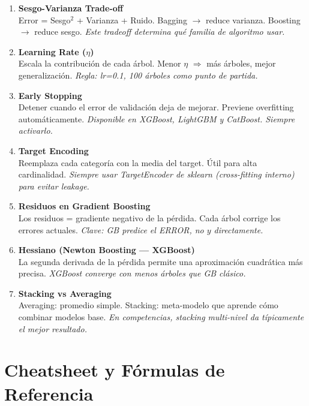 \documentclass[11pt, a4paper]{book}
\begin{document}
\begin{enumerate}[leftmargin=*, label=\textbf{\arabic*.}]
\item \textbf{Sesgo-Varianza Trade-off}\\
  Error = Sesgo$^2$ + Varianza + Ruido. Bagging $\to$ reduce varianza. Boosting $\to$ reduce sesgo.
  \textit{Este tradeoff determina qué familia de algoritmo usar.}

\item \textbf{Learning Rate ($\eta$)}\\
  Escala la contribución de cada árbol. Menor $\eta$ $\Rightarrow$ más árboles, mejor generalización.
  \textit{Regla: lr=0.1, 100 árboles como punto de partida.}

\item \textbf{Early Stopping}\\
  Detener cuando el error de validación deja de mejorar. Previene overfitting automáticamente.
  \textit{Disponible en XGBoost, LightGBM y CatBoost. Siempre activarlo.}

\item \textbf{Target Encoding}\\
  Reemplaza cada categoría con la media del target. Útil para alta cardinalidad.
  \textit{Siempre usar TargetEncoder de sklearn (cross-fitting interno) para evitar leakage.}

\item \textbf{Residuos en Gradient Boosting}\\
  Los residuos = gradiente negativo de la pérdida. Cada árbol corrige los errores actuales.
  \textit{Clave: GB predice el ERROR, no $y$ directamente.}

\item \textbf{Hessiano (Newton Boosting — XGBoost)}\\
  La segunda derivada de la pérdida permite una aproximación cuadrática más precisa.
  \textit{XGBoost converge con menos árboles que GB clásico.}

\item \textbf{Stacking vs Averaging}\\
  Averaging: promedio simple. Stacking: meta-modelo que aprende cómo combinar modelos base.
  \textit{En competencias, stacking multi-nivel da típicamente el mejor resultado.}

\end{enumerate}

\chapter{Cheatsheet y Fórmulas de Referencia}
\end{document}
